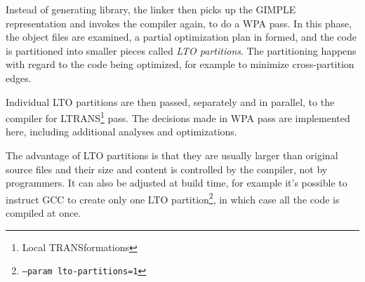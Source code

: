 Instead of generating library, the linker then picks up the GIMPLE
representation and invokes the compiler again, to do a WPA pass. In this phase,
the object files are examined, a partial optimization plan in formed, and the
code is partitioned into smaller pieces called {\sl LTO partitions}. The
partitioning happens with regard to the code being optimized, for example to
minimize cross-partition edges.

Individual LTO partitions are then passed, separately and in parallel, to the
compiler for LTRANS\footnote{Local TRANSformations} pass. The decisions made in
WPA pass are implemented here, including additional analyses and optimizations.

The advantage of LTO partitions is that they are usually larger than original
source files and their size and content is controlled by the compiler, not by
programmers. It can also be adjusted at build time, for example it's possible
to instruct GCC to create only one LTO partition\footnote{\tt --param
lto-partitions=1}, in which case all the code is
compiled at once.
